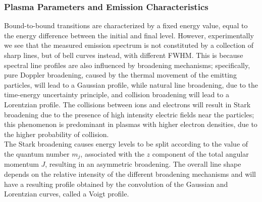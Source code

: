 \subsubsection{Plasma Parameters and Emission Characteristics}
\label{subsubsec:plasma_parameters}
Bound-to-bound transitions are characterized by a fixed energy value, equal to the energy difference between the initial and final level. However, experimentally we see that the measured emission spectrum is not constituted by a collection of sharp lines, but of bell curves instead, with different FWHM. This is because spectral line profiles are also influenced by broadening mechanisms; specifically, pure Doppler broadening, caused by the thermal movement of the emitting particles, will lead to a Gaussian profile, while natural line broadening, due to the time-energy uncertainty principle, and collision broadening will lead to a Lorentzian profile. The collisions between ions and electrons will result in Stark broadening due to the presence of high intensity electric fields near the particles; this phenomenon is predominant in plasmas with higher electron densities, due to the higher probability of collision. 
\\
The Stark broadening causes energy levels to be split according to the value of the quantum number $m_j$, associated with the $z$ component of the total angular momentum $J$, resulting in an asymmetric broadening.
The overall line shape depends on the relative intensity of the different broadening mechanisms and will have a resulting profile obtained by the convolution of the Gaussian and Lorentzian curves, called a Voigt profile.